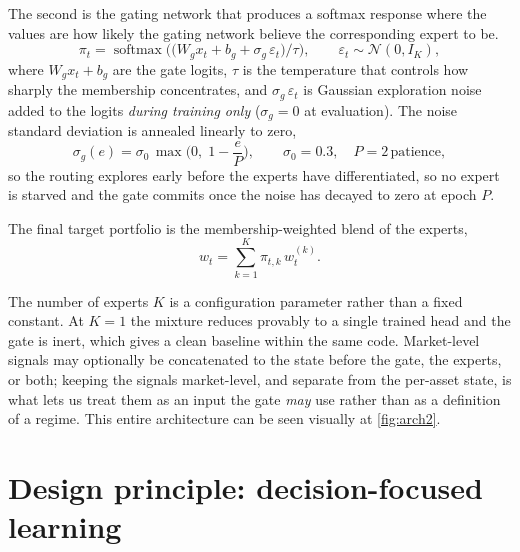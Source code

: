 The second is the gating network that produces a softmax response where the values are how likely the gating network believe the corresponding expert to be.
\begin{equation}
  \pi_t = \operatorname{softmax}\!\Big( \big(W_g x_t + b_g + \sigma_g\,\varepsilon_t\big)/\tau \Big),
  \qquad \varepsilon_t \sim \mathcal{N}(0, I_K),
  \label{eq:gate}
\end{equation}
where $W_g x_t + b_g$ are the gate logits, $\tau$ is the temperature that controls
how sharply the membership concentrates, and $\sigma_g\,\varepsilon_t$ is Gaussian
exploration noise added to the logits \emph{during training only}
($\sigma_g = 0$ at evaluation). The noise standard deviation is annealed linearly
to zero,
\begin{equation}
  \sigma_g(e) = \sigma_0 \,\max\!\Big(0,\; 1 - \frac{e}{P}\Big),
  \qquad \sigma_0 = 0.3, \quad P = 2\,\text{patience},
  \label{eq:gate-noise}
\end{equation}
so the routing explores early before the experts have differentiated, so no
expert is starved and the gate commits once the noise has decayed to zero at
epoch $P$.

The final target portfolio is the membership-weighted blend of the experts,
\begin{equation}
  w_t = \sum_{k=1}^{K} \pi_{t,k}\, w_t^{(k)}.
  \label{eq:blend}
\end{equation}

The number of experts $K$ is a configuration parameter rather than a fixed
constant. At $K = 1$ the mixture reduces provably to a single trained head and
the gate is inert, which gives a clean baseline within the same code. Market-level signals may optionally be concatenated to the state before the gate, the experts, or both; keeping the signals market-level, and separate from the per-asset state, is what lets us treat them as an input the gate \emph{may} use rather than as a definition of a regime. This entire architecture can be seen visually at \ref{fig:arch2}.

\section{Design principle: decision-focused learning}
\label{sec:principle}

